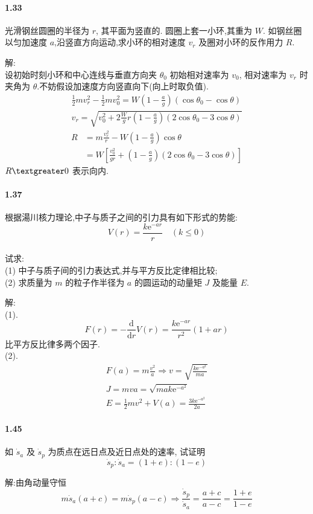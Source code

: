 \documentclass[UTF8,a4paper]{ctexart}
\begin{document}
\paragraph{1.33} 光滑钢丝圆圈的半径为 $ r $, 其平面为竖直的. 圆圈上套一小环,其重为 $ W $. 如钢丝圈以匀加速度 $ a $,沿竖直方向运动,求小环的相对速度 $ v_r $ 及圈对小环的反作用力 $ R $.
\par 解:\\
设初始时刻小环和中心连线与垂直方向夹 $\theta_0$ 初始相对速率为 $v_0$, 相对速率为 $v_r$ 时夹角为 $\theta$.不妨假设加速度方向竖直向下(向上时取负值).
\begin{gather*}
	\frac{1}{2} m v_{r}^2 - \frac{1}{2} m v_{0}^2 = W \left( 1 - \frac{a}{g} \right) \left( \cos \theta_0 - \cos \theta \right) \\
	v_r =\sqrt{ v_0^2 + 2 \frac{W}{g} r \left( 1 - \frac{a}{g} \right)\left( 2 \cos \theta_0 - 3 \cos \theta \right) } 
\end{gather*}
\begin{equation*}
	\begin{aligned}
	R &= m \frac{v_r^2}{r} - W \left( 1 - \frac{a}{g} \right) \cos \theta  \\
	&= W \left[ \frac{v_0^2}{gr} + \left( 1 - \frac{a}{g}\right) \left( 2 \cos \theta_0 - 3 \cos \theta \right) \right] 
	\end{aligned}
\end{equation*}
$R \textgreater 0$ 表示向内.

\paragraph{1.37} 根据湯川核力理论,中子与质子之间的引力具有如下形式的势能: \[ V\left( r \right) = \frac{ k \mathrm{e}^{-ar}}{r} \quad \left( k \leq 0 \right)  \]\\
试求:\\
(1) 中子与质子间的引力表达式,并与平方反比定律相比较;\\
(2) 求质量为 $ m $ 的粒子作半径为 $ a $ 的圆运动的动量矩 $ J $ 及能量 $ E $.
\par 解:\\
(1).
\[F(r) = -\frac{\mathrm{d}}{\mathrm{d}r} V \left(  r \right)  = \frac{k  \mathrm{e}^{-ar}}{r^2} \left( 1 + ar \right) \] 
比平方反比律多两个因子.\\
(2).
\begin{gather*}
	F(a) = m \frac{v^2}{a} \Rightarrow v =\sqrt{\frac{k\mathrm{e}^{-a^2}}{ma}}\\
	J = m v a = \sqrt{m a k \mathrm{e}^{-a^2}} \\
	E = \frac{1}{2} m v^2 + V(a) = \frac{3k \mathrm{e}^{-a^2}}{2a}
\end{gather*}

\paragraph{1.45} 如 $ \dot{s}_a $ 及 $ \dot{s}_p $ 为质点在远日点及近日点处的速率, 试证明\[ \dot{s}_p : \dot{s}_a = (1+e) : (1-e) \]
\par 解:由角动量守恒
\[m \dot{s}_a (a+c) = m \dot{s}_p (a-c) \Rightarrow \frac{\dot{s}_p}{\dot{s}_a } = \frac{a+c}{a-c} = \frac{1+e}{1-e}\]
\end{document}
